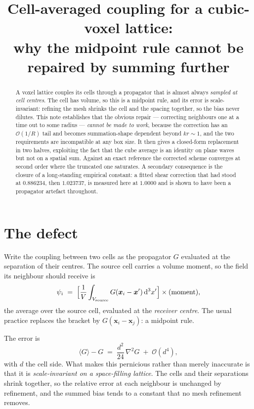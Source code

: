 \documentclass[11pt,a4paper]{article}
\title{Cell-averaged coupling for a cubic-voxel lattice:\\
       why the midpoint rule cannot be repaired by summing further}
\author{}
\date{}
\newcommand{\order}{\mathcal{O}}
\newcommand{\dd}{\mathrm{d}}
\newcommand{\avg}[1]{\langle #1 \rangle}
\begin{document}
\maketitle

\begin{abstract}
A voxel lattice couples its cells through a propagator that is almost always
\emph{sampled at cell centres}. The cell has volume, so this is a midpoint rule,
and its error is scale-invariant: refining the mesh shrinks the cell and the
spacing together, so the bias never dilutes. This note establishes that the
obvious repair --- correcting neighbours one at a time out to some radius ---
\emph{cannot be made to work}, because the correction has an $\order(1/R)$ tail
and becomes summation-shape dependent beyond $kr\sim1$, and the two requirements
are incompatible at any box size. It then gives a closed-form replacement in two
halves, exploiting the fact that the cube average is an identity on plane waves
but not on a spatial sum. Against an exact reference the corrected scheme
converges at second order where the truncated one saturates. A secondary
consequence is the closure of a long-standing empirical constant: a fitted shear
correction that had stood at $0.886234$, then $1.023737$, is measured here at
$1.0000$ and is shown to have been a propagator artefact throughout.
\end{abstract}

\tableofcontents

\section{The defect}

Write the coupling between two cells as the propagator $G$ evaluated at the
separation of their centres. The source cell carries a volume moment, so the
field its neighbour should receive is
%
\begin{equation}
  \psi_i \;=\; \Bigl[\frac{1}{V}\int_{V_{\text{source}}} G(\bm{x}_i - \bm{x}')\,\dd^3x'\Bigr]
              \times (\text{moment}),
  \label{eq:source-average}
\end{equation}
%
the average over the source cell, evaluated at the \emph{receiver centre}. The
usual practice replaces the bracket by $G(\bm{x}_i-\bm{x}_j)$: a midpoint rule.

The error is
%
\begin{equation}
  \avg{G} - G \;=\; \frac{d^{2}}{24}\,\nabla^{2}G \;+\; \order(d^{4}),
  \label{eq:midpoint-error}
\end{equation}
%
with $d$ the cell side. What makes this pernicious rather than merely
inaccurate is that it is \emph{scale-invariant on a space-filling lattice}. The
cells and their separations shrink together, so the relative error at each
neighbour is unchanged by refinement, and the summed bias tends to a constant
that no mesh refinement removes.
\end{document}
